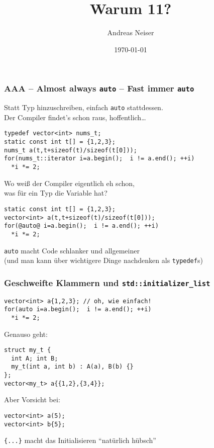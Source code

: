 \documentclass[t,ngerman]{beamer}
\author{Andreas Neiser}
\title{Warum \Cpp{}11?}
\date{\today}
\begin{document}
\frame{\maketitle}


\begin{frame}[fragile]
  \frametitle{AAA -- Almost always \lstinline!auto! -- Fast immer \lstinline!auto! }
  Statt Typ hinzuschreiben, einfach \lstinline!auto! stattdessen. \\ Der Compiler findet's schon raus, hoffentlich\ldots
  
\begin{lstlisting}
typedef vector<int> nums_t; 
static const int t[] = {1,2,3};
nums_t a(t,t+sizeof(t)/sizeof(t[0])); 
for(nums_t::iterator i=a.begin();  i != a.end(); ++i)
  *i *= 2;
\end{lstlisting}

Wo weiß der Compiler eigentlich eh schon, \\ was für ein Typ die Variable hat?

\pause 
\begin{lstlisting}
static const int t[] = {1,2,3};
vector<int> a(t,t+sizeof(t)/sizeof(t[0])); 
for(@auto@ i=a.begin();  i != a.end(); ++i)
  *i *= 2;
\end{lstlisting}

\pause 
\begin{block}{}
  \centering
  \lstinline!auto! macht Code schlanker und allgemeiner\\ \small (und man kann über wichtigere Dinge nachdenken als \lstinline|typedef|s) 
\end{block}
  
\end{frame}

\begin{frame}[fragile]
  \frametitle{Geschweifte Klammern und \lstinline|std::initializer_list|}
\begin{lstlisting}
vector<int> a{1,2,3}; // oh, wie einfach!
for(auto i=a.begin();  i != a.end(); ++i)
  *i *= 2;
\end{lstlisting}

\pause
Genauso geht:
\begin{lstlisting}
struct my_t { 
  int A; int B;
  my_t(int a, int b) : A(a), B(b) {}
};
vector<my_t> a{{1,2},{3,4}};  
\end{lstlisting}

\pause
Aber {\color{red}Vorsicht} bei:\\
\begin{lstlisting}
vector<int> a(5);
vector<int> b{5};
\end{lstlisting}

\pause 
\begin{block}{}
  \centering
  \lstinline!{...}! macht das Initialisieren \enquote{natürlich hübsch}
\end{block}

\end{frame}
\end{document}

